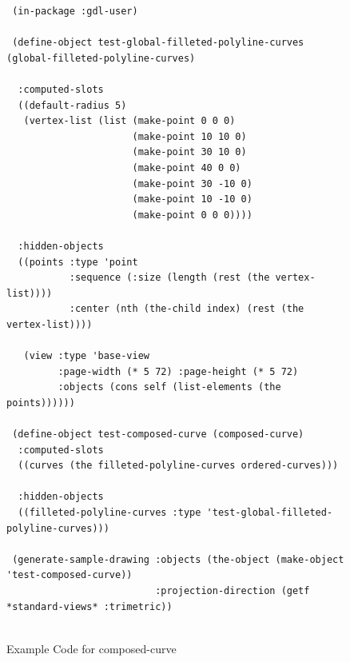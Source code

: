 \documentclass [11pt]{book}
\begin{document}
\begin{itemize}
\begin{description}
\end{description}




\begin{figure}
\begin{lrbox}{\boxedverb}
\begin{minipage}{\linewidth}
{\small

\begin{verbatim}
 (in-package :gdl-user)

 (define-object test-global-filleted-polyline-curves (global-filleted-polyline-curves)
                    
  :computed-slots
  ((default-radius 5)
   (vertex-list (list (make-point 0 0 0)
                      (make-point 10 10 0)
                      (make-point 30 10 0)
                      (make-point 40 0 0)
                      (make-point 30 -10 0)
                      (make-point 10 -10 0)
                      (make-point 0 0 0))))

  :hidden-objects
  ((points :type 'point
           :sequence (:size (length (rest (the vertex-list))))
           :center (nth (the-child index) (rest (the vertex-list))))

   (view :type 'base-view
         :page-width (* 5 72) :page-height (* 5 72)
         :objects (cons self (list-elements (the points))))))

 (define-object test-composed-curve (composed-curve)
  :computed-slots
  ((curves (the filleted-polyline-curves ordered-curves)))
  
  :hidden-objects
  ((filleted-polyline-curves :type 'test-global-filleted-polyline-curves)))

 (generate-sample-drawing :objects (the-object (make-object 'test-composed-curve))
                          :projection-direction (getf *standard-views* :trimetric))


\end{verbatim}}
\end{minipage}
\end{lrbox}
\fbox{\usebox{\boxedverb}}

\caption{Example Code for composed-curve}

\label{fig:example-code-composed-curve}

\end{figure}


\end{itemize}
\end{document}

